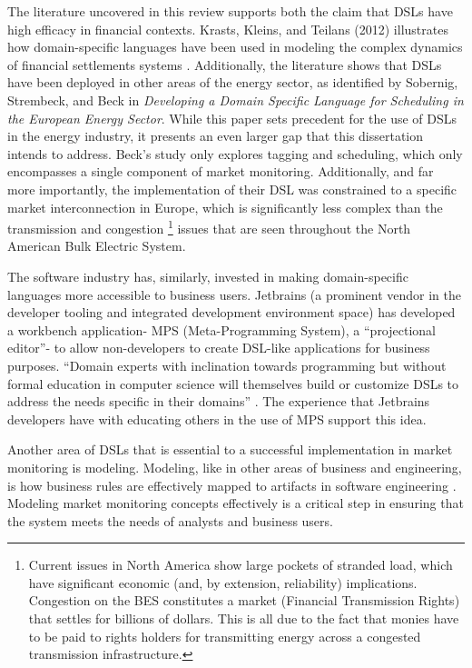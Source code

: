 The literature uncovered in this review supports both the claim that DSLs have high efficacy in financial contexts. Krasts, Kleins, and Teilans (2012) illustrates how domain-specific languages have been used in modeling the complex dynamics of financial settlements systems \cite{krasts}. Additionally, the literature shows that DSLs have been deployed in other areas of the energy sector, as identified by Sobernig, Strembeck, and Beck \cite {beck} in \textit{Developing a Domain Specific Language for Scheduling in the European Energy Sector}. While this paper sets precedent for the use of DSLs in the energy industry, it presents an even larger gap that this dissertation intends to address. Beck’s study only explores tagging and scheduling, which only encompasses a single component of market monitoring. Additionally, and far more importantly, the implementation of their DSL was constrained to a specific market interconnection in Europe, which is significantly less complex than the transmission and congestion \footnote{Current issues in North America show large pockets of stranded load, which have significant economic (and, by extension, reliability) implications. Congestion on the BES constitutes a market (Financial Transmission Rights) that settles for billions of dollars. This is all due to the fact that monies have to be paid to rights holders for transmitting energy across a congested transmission infrastructure.} issues that are seen throughout the North American Bulk Electric System.

The software industry has, similarly, invested in making domain-specific languages more accessible to business users. Jetbrains (a prominent vendor in the developer tooling and integrated development environment space) has developed a workbench application- MPS (Meta-Programming System), a “projectional editor”- to allow non-developers to create DSL-like applications for business purposes. “Domain experts with inclination towards programming but without formal education in computer science will themselves build or customize DSLs to address the needs specific in their domains” \cite{ratiu}. The experience that Jetbrains developers have with educating others in the use of MPS support this idea.

Another area of DSLs that is essential to a successful implementation in market monitoring is modeling. Modeling, like in other areas of business and engineering, is how business rules are effectively mapped to artifacts in software engineering \cite{lethrech}. Modeling market monitoring concepts effectively is a critical step in ensuring that the system meets the needs of analysts and business users.

